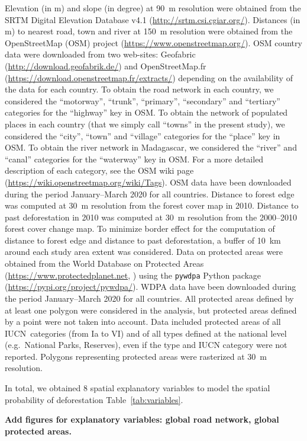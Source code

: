 \documentclass[12pt,]{article}
\begin{document}
Elevation (in m) and slope (in degree) at 90~m resolution were obtained from the SRTM Digital Elevation Database v4.1 (\url{http://srtm.csi.cgiar.org/}). Distances (in m) to nearest road, town and river at 150~m resolution were obtained from the OpenStreetMap (OSM) project (\url{https://www.openstreetmap.org/}). OSM country data were downloaded from two web-sites: Geofabric (\url{http://download.geofabrik.de/}) and OpenStreetMap.fr (\url{https://download.openstreetmap.fr/extracts/}) depending on the availability of the data for each country. To obtain the road network in each country, we considered the ``motorway'', ``trunk'', ``primary'', ``secondary'' and ``tertiary'' categories for the ``highway'' key in OSM. To obtain the network of populated places in each country (that we simply call ``towns'' in the present study), we considered the ``city'', ``town'' and ``village'' categories for the ``place'' key in OSM. To obtain the river network in Madagascar, we considered the ``river'' and ``canal'' categories for the ``waterway'' key in OSM. For a more detailed description of each category, see the OSM wiki page (\url{https://wiki.openstreetmap.org/wiki/Tags}). OSM data have been downloaded during the period January--March 2020 for all countries. Distance to forest edge was computed at 30~m resolution from the forest cover map in 2010. Distance to past deforestation in 2010 was computed at 30~m resolution from the 2000--2010 forest cover change map. To minimize border effect for the computation of distance to forest edge and distance to past deforestation, a buffer of 10~km around each study area extent was considered. Data on protected areas were obtained from the World Database on Protected Areas (\url{https://www.protectedplanet.net}, \citet{WDPA2020}) using the \texttt{pywdpa} Python package (\url{https://pypi.org/project/pywdpa/}). WDPA data have been downloaded during the period January--March 2020 for all countries. All protected areas defined by at least one polygon were considered in the analysis, but protected areas defined by a point were not taken into account. Data included protected areas of all IUCN~categories (from Ia to VI) and of all types defined at the national level (e.g.~National Parks, Reserves), even if the type and IUCN category were not reported. Polygons representing protected areas were rasterized at 30~m resolution.

In total, we obtained 8 spatial explanatory variables to model the spatial probability of deforestation Table~\ref{tab:variables}.

\textbf{Add figures for explanatory variables: global road network, global protected areas.}
\end{document}
